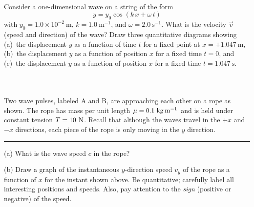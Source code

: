 \documentclass[12pt]{article}
\newcounter{problem}
\begin{document}
\paragraph{\problemname~\theproblem}

Consider a one-dimensional wave on a string of the form
\begin{equation}
y = y_0 \cos(k\,x + \omega\,t)
\end{equation}
with $y_0= 1.0\times 10^{-2}~\mathrm{m}$, $k= 1.0~\mathrm{m^{-1}}$,
and $\omega= 2.0~\mathrm{s^{-1}}$.  What is the velocity $\vec{v}$
(speed and direction) of the wave?  Draw three quantitative diagrams
showing (a)~the displacement $y$ as a function of time $t$ for a fixed
point at $x= +1.047~\mathrm{m}$, (b)~the displacement $y$ as a
function of position $x$ for a fixed time $t=0$, and (c)~the
displacement $y$ as a function of position $x$ for a fixed time $t=
1.047~\mathrm{s}$.

\paragraph{\problemname~\theproblem}

Two wave pulses, labeled A and B, are approaching each other on a rope
as shown.  The rope has mass per unit length $\mu= 0.1~{\rm
kg\,m^{-1}}$ and is held under constant tension $T= 10~{\rm N}$.
Recall that although the waves travel in the $+x$ and $-x$ directions,
each piece of the rope is only moving in the $y$ direction.
\\ \rule{0.1\textwidth}{0pt}

(a) What is the wave speed $c$ in the rope?

(b) Draw a graph of the instantaneous $y$-direction speed $v_y$ of the
rope as a function of $x$ for the instant shown above.  Be
quantitative; carefully label all interesting positions and speeds.
Also, pay attention to the {\em sign} (positive or negative) of the
speed.
\end{document}
